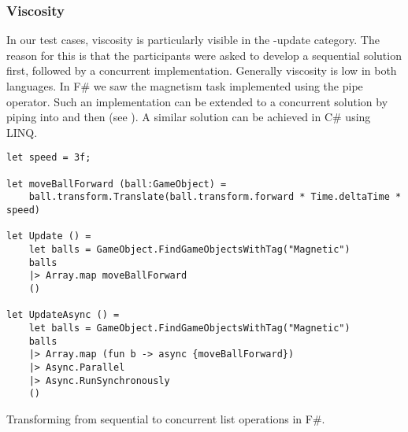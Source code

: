 \subsubsection{Viscosity}
In our test cases, viscosity is particularly visible in the -update category. The reason for this is that the participants were asked to develop a sequential solution first, followed by a concurrent implementation. Generally viscosity is low in both languages. In F\# we saw the magnetism task implemented using the pipe operator. Such an implementation can be extended to a concurrent solution by piping into  and then  (see ). A similar solution can be achieved in C\# using \gls{LINQ}.

\begin{listing}[H]
    \begin{verbatim}
let speed = 3f;

let moveBallForward (ball:GameObject) =
    ball.transform.Translate(ball.transform.forward * Time.deltaTime * speed)

let Update () =
    let balls = GameObject.FindGameObjectsWithTag("Magnetic")
    balls
    |> Array.map moveBallForward
    ()

let UpdateAsync () =
    let balls = GameObject.FindGameObjectsWithTag("Magnetic")
    balls
    |> Array.map (fun b -> async {moveBallForward})
    |> Async.Parallel
    |> Async.RunSynchronously
    ()
    \end{verbatim}
    \caption{Transforming from sequential to concurrent list operations in F\#.}
    \label{lst:fsharp:pipe:async}
\end{listing}

